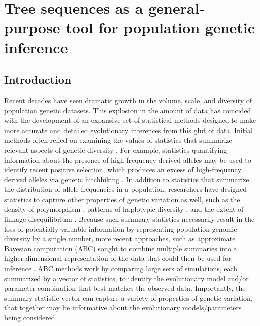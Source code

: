 \chapter{Tree sequences as a general-purpose tool for population genetic inference}

\section{Introduction}

Recent decades have seen dramatic growth in the volume, scale, and diversity of population genetic datasets. This explosion in the amount of data has coincided with the development of an expansive set of statistical methods designed to make more accurate and detailed evolutionary inferences from this glut of data. Initial methods often relied on examining the values of statistics that summarize relevant aspects of genetic diversity \cite{fuStatisticalTestsNeutrality1993,neiMathematicalModelStudying1979,tajimaStatisticalMethodTesting1989,wattersonNumberSegregatingSites1975}. For example, statistics quantifying information about the presence of high-frequency derived alleles may be used to identify recent positive selection, which produces an excess of high-frequency derived alleles via genetic hitchhiking \cite{fayHitchhikingPositiveDarwinian2000}. In addition to statistics that summarize the distribution of allele frequencies in a population, researchers have designed statistics to capture other properties of genetic variation as well, such as the density of polymorphism \cite{neiMathematicalModelStudying1979,neiDNAPolymorphismDetectable1981}, patterns of haplotypic diversity \cite{garudRecentSelectiveSweeps2015,hudsonEvidencePositiveSelection1994,sabetiDetectingRecentPositive2002,voightMapRecentPositive2006}, and the extent of linkage disequilibrium \cite{kellyTestNeutralityBased1997,kimLinkageDisequilibriumSignature2004}. Because such summary statistics necessarily result in the loss of potentially valuable information by representing population genomic diversity by a single number, more recent approaches, such as approximate Bayesian computation (ABC) sought to combine multiple summaries into a higher-dimensional representation of the data that could then be used for inference \cite{beaumontApproximateBayesianComputation2002,pritchardPopulationGrowthHuman1999,tavareInferringCoalescenceTimes1997}. ABC methods work by comparing large sets of simulations, each summarized by a vector of statistics, to identify the evolutionary model and/or parameter combination that best matches the observed data. Importantly, the summary statistic vector can capture a variety of properties of genetic variation, that together may be informative about the evolutionary models/parameters being considered.

